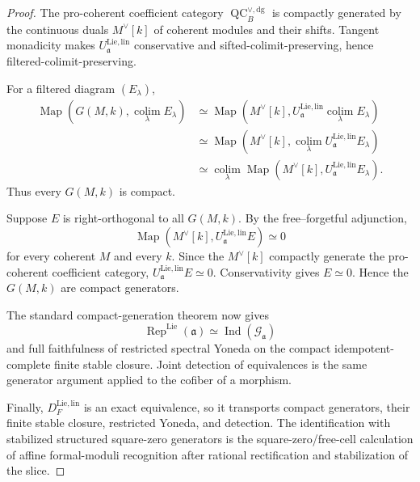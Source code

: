 \begin{proof}
The pro-coherent coefficient category
$\operatorname{QC}^{\vee,\mathrm{dg}}_B$ is compactly generated by the
continuous duals $M^\vee[k]$ of coherent modules and their shifts.  Tangent
monadicity makes
$U_{\mathfrak a}^{\mathrm{Lie,lin}}$ conservative and
sifted-colimit-preserving, hence filtered-colimit-preserving.

For a filtered diagram $(E_\lambda)$,
\[
\begin{aligned}
\operatorname{Map}
\left(
    G(M,k),
    \operatorname*{colim}_\lambda E_\lambda
\right)
&\simeq
\operatorname{Map}
\left(
    M^\vee[k],
    U_{\mathfrak a}^{\mathrm{Lie,lin}}
    \operatorname*{colim}_\lambda E_\lambda
\right)\\
&\simeq
\operatorname{Map}
\left(
    M^\vee[k],
    \operatorname*{colim}_\lambda
    U_{\mathfrak a}^{\mathrm{Lie,lin}}E_\lambda
\right)\\
&\simeq
\operatorname*{colim}_\lambda
\operatorname{Map}
\left(
    M^\vee[k],
    U_{\mathfrak a}^{\mathrm{Lie,lin}}E_\lambda
\right).
\end{aligned}
\]
Thus every $G(M,k)$ is compact.

Suppose $E$ is right-orthogonal to all $G(M,k)$.  By the free--forgetful
adjunction,
\[
    \operatorname{Map}
    \left(
        M^\vee[k],
        U_{\mathfrak a}^{\mathrm{Lie,lin}}E
    \right)
    \simeq0
\]
for every coherent $M$ and every $k$.  Since the $M^\vee[k]$ compactly
generate the pro-coherent coefficient category,
$U_{\mathfrak a}^{\mathrm{Lie,lin}}E\simeq0$.  Conservativity gives
$E\simeq0$.  Hence the $G(M,k)$ are compact generators.

The standard compact-generation theorem now gives
\[
    \operatorname{Rep}^{\mathrm{Lie}}(\mathfrak a)
    \simeq
    \operatorname{Ind}(\mathcal G_{\mathfrak a})
\]
and full faithfulness of restricted spectral Yoneda on the compact
idempotent-complete finite stable closure.  Joint detection of equivalences is
the same generator argument applied to the cofiber of a morphism.

Finally,
$D_F^{\mathrm{Lie,lin}}$ is an exact equivalence, so it transports compact
generators, their finite stable closure, restricted Yoneda, and detection.
The identification with stabilized structured square-zero generators is the
square-zero/free-cell calculation of affine formal-moduli recognition after
rational rectification and stabilization of the slice.
\end{proof}

